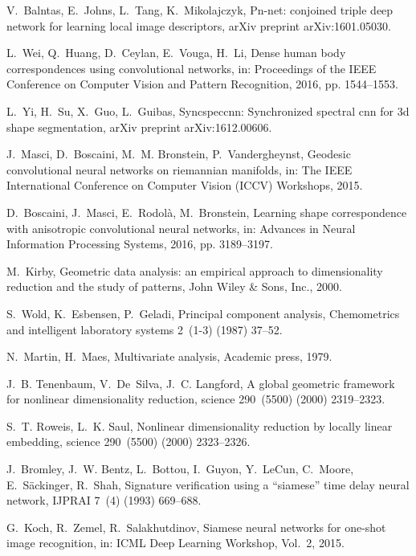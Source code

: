 \documentclass[5p,twocolumn,10pt,times]{elsarticle}
\begin{document}
\begin{thebibliography}{10}
V.~Balntas, E.~Johns, L.~Tang, K.~Mikolajczyk, Pn-net: conjoined triple deep
  network for learning local image descriptors, arXiv preprint
  arXiv:1601.05030.

L.~Wei, Q.~Huang, D.~Ceylan, E.~Vouga, H.~Li, Dense human body correspondences
  using convolutional networks, in: Proceedings of the IEEE Conference on
  Computer Vision and Pattern Recognition, 2016, pp. 1544--1553.

L.~Yi, H.~Su, X.~Guo, L.~Guibas, Syncspeccnn: Synchronized spectral cnn for 3d
  shape segmentation, arXiv preprint arXiv:1612.00606.

J.~Masci, D.~Boscaini, M.~M. Bronstein, P.~Vandergheynst, Geodesic
  convolutional neural networks on riemannian manifolds, in: The IEEE
  International Conference on Computer Vision (ICCV) Workshops, 2015.

D.~Boscaini, J.~Masci, E.~Rodol{\`a}, M.~Bronstein, Learning shape
  correspondence with anisotropic convolutional neural networks, in: Advances
  in Neural Information Processing Systems, 2016, pp. 3189--3197.

M.~Kirby, Geometric data analysis: an empirical approach to dimensionality
  reduction and the study of patterns, John Wiley \& Sons, Inc., 2000.

S.~Wold, K.~Esbensen, P.~Geladi, Principal component analysis, Chemometrics and
  intelligent laboratory systems 2~(1-3) (1987) 37--52.

N.~Martin, H.~Maes, Multivariate analysis, Academic press, 1979.

J.~B. Tenenbaum, V.~De~Silva, J.~C. Langford, A global geometric framework for
  nonlinear dimensionality reduction, science 290~(5500) (2000) 2319--2323.

S.~T. Roweis, L.~K. Saul, Nonlinear dimensionality reduction by locally linear
  embedding, science 290~(5500) (2000) 2323--2326.

J.~Bromley, J.~W. Bentz, L.~Bottou, I.~Guyon, Y.~LeCun, C.~Moore,
  E.~S{\"a}ckinger, R.~Shah, Signature verification using a ``siamese'' time
  delay neural network, IJPRAI 7~(4) (1993) 669--688.

G.~Koch, R.~Zemel, R.~Salakhutdinov, Siamese neural networks for one-shot image
  recognition, in: ICML Deep Learning Workshop, Vol.~2, 2015.


\end{thebibliography}
\end{document}
